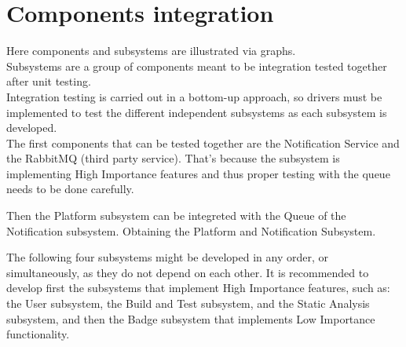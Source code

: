 \section{Components integration}
Here components and subsystems are illustrated via graphs. \\
Subsystems are a group of components meant to be integration tested together after unit testing.\\
Integration testing is carried out in a bottom-up approach, so drivers must be implemented to test the different independent subsystems as each subsystem is developed.\\
The first components that can be tested together are the Notification Service and the RabbitMQ (third party service).
That's because the subsystem is implementing High Importance features and thus proper testing with the queue needs to be done carefully.
\begin{adjustbox}{
        max size={\textwidth}{},
        center,
        caption={Notitification subsystem},
        label={fig:Notitification subsystem},
        figure=H}
\end{adjustbox}

Then the Platform subsystem can be integreted with the Queue of the Notification subsystem.
Obtaining the Platform and Notification Subsystem.
\begin{adjustbox}{
        max size={\textwidth}{},
        center,
        caption={Platform and Notification subsystem},
        label={fig:Platform and Notification subsystem},
        figure=H}
\end{adjustbox}

The following four subsystems might be developed in any order, or simultaneously, as they do not depend
on each other.
It is recommended to develop first the subsystems that implement High Importance features, such as:\\
the User subsystem, the Build and Test subsystem, and the Static Analysis subsystem, and then the Badge subsystem that implements Low Importance functionality.
\begin{adjustbox}{
        max size={\textwidth}{},
        center,
        caption={User subsystem},
        label={fig:User subsystem},
        figure=H}
\end{adjustbox}

